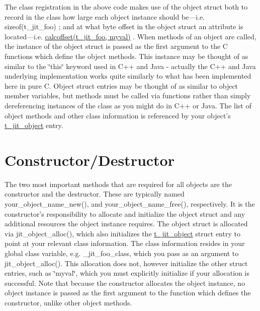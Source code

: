 The class registration in the above code makes use of the object struct both to record in the class how large each object instance should be—i.e. sizeof(t\_\-jit\_\-foo) ; and at what byte offset in the object struct an attribute is located—i.e. \hyperlink{group__misc_gaad95899dfbc7b5b8fe11921643ef46f0}{calcoffset(t\_\-jit\_\-foo, myval)} . When methods of an object are called, the instance of the object struct is passed as the first argument to the C functions which define the object methods. This instance may be thought of as similar to the \char`\"{}this\char`\"{} keyword used in C++ and Java -\/ actually the C++ and Java underlying implementation works quite similarly to what has been implemented here in pure C. Object struct entries may be thought of as similar to object member variables, but methods must be called via functions rather than simply dereferencing instances of the class as you might do in C++ or Java. The list of object methods and other class information is referenced by your object's \hyperlink{group__jitter_ga0eb2cd9c8e3b9803ba31069575a1ffb9}{t\_\-jit\_\-object} entry.\hypertarget{chapter_jit_objectmodel_chapter_jit_objectmodel_ctordtor}{}\section{Constructor/Destructor}\label{chapter_jit_objectmodel_chapter_jit_objectmodel_ctordtor}
The two most important methods that are required for all objects are the constructor and the destructor. These are typically named your\_\-object\_\-name\_\-new(), and your\_\-object\_\-name\_\-free(), respectively. It is the constructor's responsibility to allocate and initialize the object struct and any additional resources the object instance requires. The object struct is allocated via jit\_\-object\_\-alloc(), which also initializes the \hyperlink{group__jitter_ga0eb2cd9c8e3b9803ba31069575a1ffb9}{t\_\-jit\_\-object} struct entry to point at your relevant class information. The class information resides in your global class variable, e.g. \_\-jit\_\-foo\_\-class, which you pass as an argument to jit\_\-object\_\-alloc(). This allocation does not, however initialize the other struct entries, such as \char`\"{}myval\char`\"{}, which you must explicitly initialize if your allocation is successful. Note that because the constructor allocates the object instance, no object instance is passed as the first argument to the function which defines the constructor, unlike other object methods.

